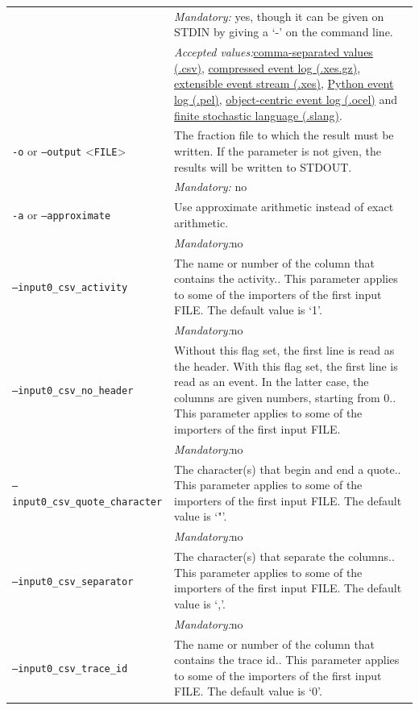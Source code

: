 {\begin{tabularx}{\linewidth}{lX}
&\textit{Mandatory:} \quad yes, though it can be given on STDIN by giving a `-' on the command line.\\
&\textit{Accepted values:}\quad \hyperref[filehandler:comma-separated values]{comma-separated values (.csv)}, \hyperref[filehandler:compressed event log]{compressed event log (.xes.gz)}, \hyperref[filehandler:extensible event stream]{extensible event stream (.xes)}, \hyperref[filehandler:Python event log]{Python event log (.pel)}, \hyperref[filehandler:object-centric event log]{object-centric event log (.ocel)} and \hyperref[filehandler:finite stochastic language]{finite stochastic language (.slang)}.\\
\texttt{-o} or \texttt{--output} <\texttt{FILE}> &
The fraction file to which the result must be written. If the parameter is not given, the results will be written to STDOUT.\\
&\textit{Mandatory:} \quad no\\
\texttt{-a} or \texttt{--approximate} & Use approximate arithmetic instead of exact arithmetic.\\
&\textit{Mandatory:}\quad no\\
\texttt{--input0\_csv\_activity} & The name or number of the column that contains the activity.. This parameter applies to some of the importers of the first input FILE. The default value is `1'.\\
&\textit{Mandatory:}\quad no\\
\texttt{--input0\_csv\_no\_header} & Without this flag set, the first line is read as the header. 
    With this flag set, the first line is read as an event. In the latter case, the columns are given numbers, starting from 0.. This parameter applies to some of the importers of the first input FILE. \\
&\textit{Mandatory:}\quad no\\
\texttt{--input0\_csv\_quote\_character} & The character(s) that begin and end a quote.. This parameter applies to some of the importers of the first input FILE. The default value is `"'.\\
&\textit{Mandatory:}\quad no\\
\texttt{--input0\_csv\_separator} & The character(s) that separate the columns.. This parameter applies to some of the importers of the first input FILE. The default value is `,'.\\
&\textit{Mandatory:}\quad no\\
\texttt{--input0\_csv\_trace\_id} & The name or number of the column that contains the trace id.. This parameter applies to some of the importers of the first input FILE. The default value is `0'.\\

\end{tabularx}}
